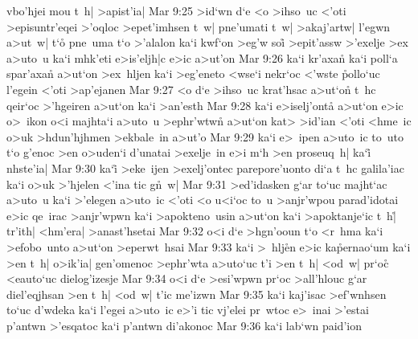 vbo'hjei
mou
t~h|
>apist'ia|\bibvsend
\vs Mar 9:25
>id`wn
d`e
<o
>ihso~uc
<'oti
>episuntr'eqei
>'oqloc
>epet'imhsen
t~w|
pne'umati
t~w|
>akaj'artw|
l'egwn
a>ut~w|
t`o\r{}
pne~uma
t`o
>'alalon
ka`i
kwf`on
>eg'w
soi\r{}
>epit'assw
>'exelje
>ex
a>uto~u
ka`i
mhk'eti
e>is'eljh|c
e>ic
a>ut'on\bibvsend
\vs Mar 9:26
ka`i
kr'axa\r{n}
ka`i
poll`a
spar'axan\r{}
a>ut`on
>ex~hljen
ka`i
>eg'eneto
<wse`i
nekr`oc
<'wste
\r{p}ollo`uc
l'egein
<'oti
>ap'ejanen\bibvsend
\vs Mar 9:27
<o
d`e
>ihso~uc
krat'hsac
a>ut`on\r{}
t~hc
qeir`oc
>'hgeiren
a>ut`on
ka`i
>an'esth\bibvsend
\vs Mar 9:28
ka`i
e>iselj'onta\r{}
a>ut`on
e>ic
o>~ikon
o<i
majhta`i
a>uto~u
>ephr'wtwn\r{}
a>ut`on
kat>
>id'ian
<'oti
<hme~ic
o>uk
>hdun'hjhmen
>ekbale~in
a>ut'o\bibvsend
\vs Mar 9:29
ka`i
e>~ipen
a>uto~ic
to~uto
t`o
g'enoc
>en
o>uden`i
d'unatai
>exelje~in
e>i
m`h
>en
proseuq~h|
ka`i\r{}
nhste'ia|\bibvsend
\vs Mar 9:30
ka`i\r{}
>eke~ijen
>exelj'ontec
parepore'uonto
di`a
t~hc
galila'iac
ka`i
o>uk
>'hjelen
<'ina
tic
g\r{n}~w|\bibvsend
{}
\vs Mar 9:31
>ed'idasken
g`ar
to`uc
majht`ac
a>uto~u
ka`i
>'elegen
a>uto~ic
<'oti
<o
u<i`oc
to~u
>anjr'wpou
parad'idotai
e>ic
qe~irac
>anjr'wpwn
ka`i
>apokteno~usin
a>ut`on
ka`i
>apoktanje`ic
t~h|\r{}
tr'ith|
<hm'era|
>anast'hsetai\bibvsend
\vs Mar 9:32
o<i
d`e
>hgn'ooun
t`o
<r~hma
ka`i
>efobo~unto
a>ut`on
>eperwt~hsai\bibvsend
\vs Mar 9:33
ka`i
>~hlj\r{e}n
e>ic
ka\r{p}ernao`um
ka`i
>en
t~h|
o>ik'ia|
gen'omenoc
>ephr'wta
a>uto`uc
t'i
>en
t~h|
<od~w|
pr`oc\r{}
<eauto`uc
dielog'izesje\bibvsend
\vs Mar 9:34
o<i
d`e
>esi'wpwn
pr`oc
>all'hlouc
g`ar
diel'eqjhsan
>en
t~h|
<od~w|
t'ic
me'izwn\bibvsend
\vs Mar 9:35
ka`i
kaj'isac
>ef'wnhsen
to`uc
d'wdeka
ka`i
l'egei
a>uto~ic
e>'i
tic
vj'elei
pr~wtoc
e>~inai
>'estai
p'antwn
>'esqatoc
ka`i
p'antwn
di'akonoc\bibvsend
\vs Mar 9:36
ka`i
lab`wn
paid'ion
